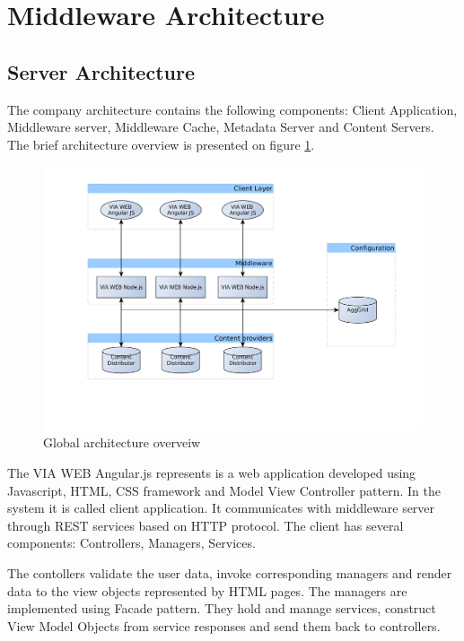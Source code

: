 \section{Middleware Architecture}

\subsection{Server Architecture}

The company architecture contains the following components: Client Application, Middleware server, Middleware Cache, Metadata Server and Content Servers. The brief architecture overview is presented on figure \ref{fig:arch_overview}. 


\begin{figure}[h]
    \centering
	\includegraphics[width=\textwidth]{images/thesis_global_architecture_existing.png}
    \caption{Global architecture overveiw}
    \label{fig:arch_overview}
\end{figure}


The VIA WEB Angular.js represents is a web application developed using Javascript, HTML, CSS framework and Model View Controller pattern. In the system it is called client application. It communicates with middleware server through REST services based on HTTP protocol. The client has several components: Controllers, Managers, Services. 

The contollers validate the user data, invoke corresponding managers and render data to the view objects represented by HTML pages. The managers are implemented using Facade pattern\cite{DesignPatterns}. They hold and manage services, construct View Model Objects from service responses and send them back to controllers. 

